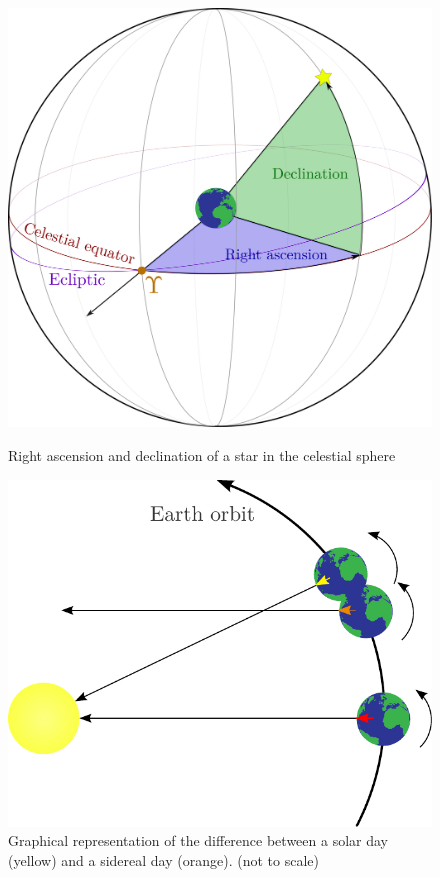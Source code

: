 \documentclass[../main.tex]{subfiles}
\begin{document}
\begin{figure}[htbp]
  \centering
  \begin{minipage}[ht]{0.47\textwidth}
    \centering
    \includegraphics[width=\textwidth]{Images/right_ascension-decli.pdf}
    \caption{Right ascension and declination of a star in the celestial sphere}
    \label{fig:right_ascesion}
  \end{minipage}
  \hspace{0.02\textwidth}
  \begin{minipage}[ht]{0.47\textwidth}
    \centering
    \includegraphics[width=\textwidth]{Images/sidereal.pdf}
    \caption{Graphical representation of the difference between a solar day (yellow) and a sidereal day (orange). (not to scale)}
    \label{fig:sidereal}
  \end{minipage}
\end{figure}
\end{document}
